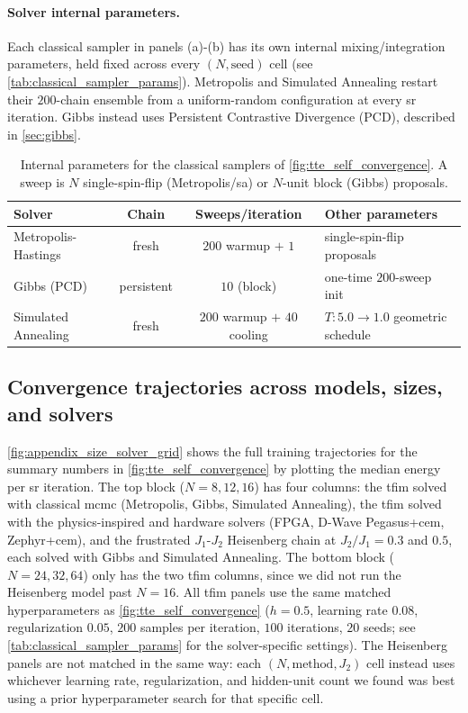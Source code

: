 \documentclass[10pt,a4paper]{article}
\numberwithin{equation}{section}
\begin{document}
\paragraph{Solver internal parameters.}
Each classical sampler in panels (a)-(b) has its own internal mixing/integration parameters, held fixed across every $(N,\text{seed})$ cell (see \autoref{tab:classical_sampler_params}). Metropolis and Simulated Annealing restart their $200$-chain ensemble from a uniform-random configuration at every \gls{sr} iteration. Gibbs instead uses Persistent Contrastive Divergence (PCD), described in \autoref{sec:gibbs}.
\begin{table}[htbp]
\centering
\small
\begin{tabular}{lccl}
\toprule
Solver & Chain & Sweeps/iteration & Other parameters \\
\midrule
Metropolis-Hastings & fresh & $200$ warmup $+$ $1$ & single-spin-flip proposals \\
Gibbs (PCD) & persistent & $10$ (block) & one-time $200$-sweep init \\
Simulated Annealing & fresh & $200$ warmup $+$ $40$ cooling & $T: 5.0\to1.0$ geometric schedule \\
\bottomrule
\end{tabular}
\caption{Internal parameters for the classical samplers of \autoref{fig:tte_self_convergence}. A sweep is $N$ single-spin-flip (Metropolis/\gls{sa}) or $N$-unit block (Gibbs) proposals.}
\label{tab:classical_sampler_params}
\end{table}

\subsection{Convergence trajectories across models, sizes, and solvers}
\autoref{fig:appendix_size_solver_grid} shows the full training trajectories for the summary numbers in \autoref{fig:tte_self_convergence} by plotting the median energy per \gls{sr} iteration. The top block ($N=8,12,16$) has four columns: the \gls{tfim} solved with classical \gls{mcmc} (Metropolis, Gibbs, Simulated Annealing), the \gls{tfim} solved with the physics-inspired and hardware solvers (FPGA, D-Wave Pegasus+\gls{cem}, Zephyr+\gls{cem}), and the frustrated $J_1$-$J_2$ Heisenberg chain at $J_2/J_1=0.3$ and $0.5$, each solved with Gibbs and Simulated Annealing. The bottom block ($N=24,32,64$) only has the two \gls{tfim} columns, since we did not run the Heisenberg model past $N=16$. All \gls{tfim} panels use the same matched hyperparameters as \autoref{fig:tte_self_convergence} ($h=0.5$, learning rate $0.08$, regularization $0.05$, $200$ samples per iteration, $100$ iterations, $20$ seeds; see \autoref{tab:classical_sampler_params} for the solver-specific settings). The Heisenberg panels are not matched in the same way: each $(N,\text{method},J_2)$ cell instead uses whichever learning rate, regularization, and hidden-unit count we found was best using a prior hyperparameter search for that specific cell.
\end{document}
